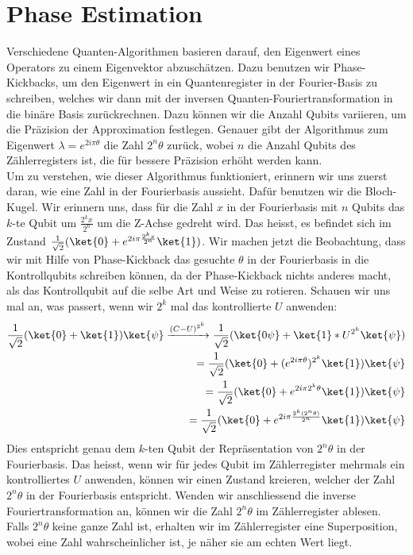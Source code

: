 \section{Phase Estimation}
Verschiedene Quanten-Algorithmen basieren darauf, den Eigenwert eines Operators zu einem Eigenvektor abzuschätzen. Dazu benutzen wir Phase-Kickbacks, um den Eigenwert in ein Quantenregister in der Fourier-Basis zu schreiben, welches wir dann mit der inversen Quanten-Fouriertransformation in die binäre Basis zurückrechnen. Dazu können wir die Anzahl Qubits variieren, um die Präzision der Approximation festlegen. Genauer gibt der Algorithmus zum Eigenwert $\lambda = e^{2i\pi\theta}$ die Zahl $2^n\theta$ zurück, wobei $n$ die Anzahl Qubits des Zählerregisters ist, die für bessere Präzision erhöht werden kann. 
\\
Um zu verstehen, wie dieser Algorithmus funktioniert, erinnern wir uns zuerst daran, wie eine Zahl in der Fourierbasis aussieht. Dafür benutzen wir die Bloch-Kugel. Wir erinnern uns, dass für die Zahl $x$ in der Fourierbasis mit $n$ Qubits das $k$-te Qubit um $\frac{2^kx}{2^n}$ um die Z-Achse gedreht wird. Das heisst, es befindet sich im Zustand $\frac{1}{\sqrt{2}}(\ket{0} + e^{2i\pi\frac{2^kx}{2^n}}\ket{1})$. Wir machen jetzt die Beobachtung, dass wir mit Hilfe von Phase-Kickback das gesuchte $\theta$ in der Fourierbasis in die Kontrollqubits schreiben können, da der Phase-Kickback nichts anderes macht, als das Kontrollqubit auf die selbe Art und Weise zu rotieren. Schauen wir uns mal an, was passert, wenn wir $2^k$ mal das kontrollierte $U$ anwenden:
\begin{align*}
\frac{1}{\sqrt{2}}(\ket{0} + \ket{1})\ket{\psi} \xrightarrow{(C-U)^{2^k}} \frac{1}{\sqrt{2}}(\ket{0\psi} + \ket{1}*U^{2^k}\ket{\psi}) \\ = \frac{1}{\sqrt{2}}(\ket{0} + (e^{2i\pi\theta})^{2^k}\ket{1})\ket{\psi} \\
= \frac{1}{\sqrt{2}}(\ket{0} + e^{2i\pi2^k\theta}\ket{1})\ket{\psi} \\
= \frac{1}{\sqrt{2}}(\ket{0} + e^{2i\pi\frac{2^k(2^n\theta)}{2^n}}\ket{1})\ket{\psi}
\end{align*}
Dies entspricht genau dem $k$-ten Qubit der Repräsentation von $2^n\theta$ in der Fourierbasis. Das heisst, wenn wir für jedes Qubit im Zählerregister mehrmals ein kontrolliertes $U$ anwenden, können wir einen Zustand kreieren, welcher der Zahl $2^n\theta$ in der Fourierbasis entspricht. Wenden wir anschliessend die inverse Fouriertransformation an, können wir die Zahl $2^n\theta$ im Zählerregister ablesen. Falls $2^n\theta$ keine ganze Zahl ist, erhalten wir im Zählerregister eine Superposition, wobei eine Zahl wahrscheinlicher ist, je näher sie am echten Wert liegt.

